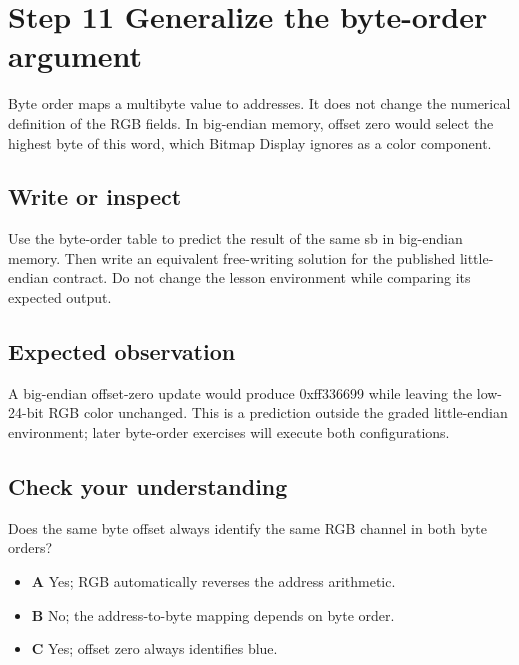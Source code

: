 \section{Step 11 Generalize the byte-order
  argument}\label{002-single-pixel-s11-step-11-generalize-the-byte-order-argument}

Byte order maps a multibyte value to addresses. It does not change the
numerical definition of the RGB fields. In big-endian memory, offset
zero would select the highest byte of this word, which Bitmap Display
ignores as a color component.

\subsection{Write or
  inspect}\label{002-single-pixel-s11-write-or-inspect}

Use the byte-order table to predict the result of the same sb in
big-endian memory. Then write an equivalent free-writing solution for
the published little-endian contract. Do not change the lesson
environment while comparing its expected output.

\subsection{Expected
  observation}\label{002-single-pixel-s11-expected-observation}

A big-endian offset-zero update would produce 0xff336699 while leaving
the low-24-bit RGB color unchanged. This is a prediction outside the
graded little-endian environment; later byte-order exercises will
execute both configurations.

\subsection{Check your
  understanding}\label{002-single-pixel-s11-check-your-understanding}

Does the same byte offset always identify the same RGB channel in both
byte orders?

\begin{itemize}
  \tightlist
  \item
        \textbf{A} Yes; RGB automatically reverses the address arithmetic.
  \item
        \textbf{B} No; the address-to-byte mapping depends on byte order.
  \item
        \textbf{C} Yes; offset zero always identifies blue.
\end{itemize}
